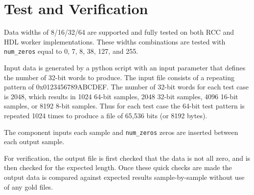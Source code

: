 \section*{Test and Verification}
\begin{flushleft}
	Data widths of 8/16/32/64 are supported and fully tested on both RCC and HDL worker implementations. These widths combinations are tested with \verb+num_zeros+ equal to 0, 7, 8, 38, 127, and 255.\medskip

	Input data is generated by a python script with an input parameter that defines the number of 32-bit words to produce. The input file consists of a repeating pattern of 0x0123456789ABCDEF. The number of 32-bit words for each test case is 2048, which results in 1024 64-bit samples, 2048 32-bit samples, 4096 16-bit samples, or 8192 8-bit samples. Thus for each test case the 64-bit test pattern is repeated 1024 times to produce a file of 65,536 bits (or 8192 bytes).\medskip

	The \Comp{} component inputs each sample and \verb+num_zeros+ zeros are inserted between each output sample.\medskip

	For verification, the output file is first checked that the data is not all zero, and is then checked for the expected length. Once these quick checks are made the output data is compared against expected results sample-by-sample without use of any gold files.
\end{flushleft}

